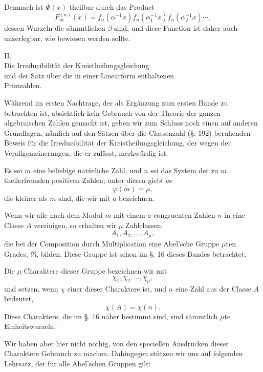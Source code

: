 \documentclass[11pt]{article}
\begin{document}
Demnach ist $\Phi(x)$ theilbar durch das Product
\[
F_m^{(n)}(x)=f_n(\alpha^{-1}x)f_n(\alpha_1^{-1}x)f_n(\alpha_2^{-1}x)\cdots,
\]
dessen Wurzeln die sämmtlichen $\beta$ sind, und diese Function ist daher auch unzerlegbar, wie bewiesen werden sollte.

\begin{center}
{\large II.}\\[0.5em]
{\large Die Irreducibilität der Kreistheilungsgleichung\\
und der Satz über die in einer Linearform enthaltenen\\
Primzahlen.}
\end{center}

Während im ersten Nachtrage, der als Ergänzung zum ersten Bande zu betrachten ist, absichtlich kein Gebrauch von der Theorie der ganzen algebraischen Zahlen gemacht ist, geben wir zum Schluss noch einen auf anderen Grundlagen, nämlich auf den Sätzen über die Classenzahl (§. 192) beruhenden Beweis für die Irreducibilität der Kreistheilungsgleichung, der wegen der Verallgemeinerungen, die er zulässt, merkwürdig ist.

Es sei $m$ eine beliebige natürliche Zahl, und $n$ sei das System der zu $m$ theilerfremden positiven Zahlen; unter diesen giebt es
\begin{equation}\tag{1}
\varphi(m)=\mu,
\end{equation}
die kleiner als $m$ sind, die wir mit $a$ bezeichnen.

Wenn wir alle nach dem Modul $m$ mit einem $a$ congruenten Zahlen $n$ in eine Classe $A$ vereinigen, so erhalten wir $\mu$ Zahlclassen:
\begin{equation}\tag{2}
A_1,A_2,\ldots,A_\mu,
\end{equation}
die bei der Composition durch Multiplication eine Abel'sche Gruppe $\mu$ten Grades, $\mathfrak R$, bilden. Diese Gruppe ist schon im §. 16 dieses Bandes betrachtet.

Die $\mu$ Charaktere dieser Gruppe bezeichnen wir mit
\begin{equation}\tag{3}
\chi_1,\chi_2,\ldots,\chi_\mu,
\end{equation}
und setzen, wenn $\chi$ einer dieser Charaktere ist, und $n$ eine Zahl aus der Classe $A$ bedeutet,
\begin{equation}\tag{4}
\chi(A)=\chi(n).
\end{equation}
Diese Charaktere, die im §. 16 näher bestimmt sind, sind sämmtlich $\mu$te Einheitswurzeln.

Wir haben aber hier nicht nöthig, von den speciellen Ausdrücken dieser Charaktere Gebrauch zu machen. Dahingegen stützen wir uns auf folgenden Lehrsatz, der für alle Abel'schen Gruppen gilt:
\end{document}
